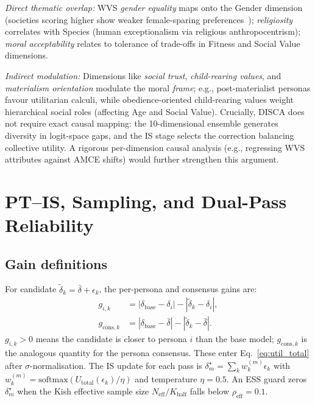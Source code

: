 \documentclass{article}
\begin{document}
\emph{Direct thematic overlap:} WVS \emph{gender equality} maps onto the
Gender dimension (societies scoring higher show weaker female-sparing
preferences~\citep{awad2018moral}); \emph{religiosity} correlates with
Species (human exceptionalism via religious anthropocentrism);
\emph{moral acceptability} relates to tolerance of trade-offs in Fitness and
Social Value dimensions.

\emph{Indirect modulation:} Dimensions like \emph{social trust},
\emph{child-rearing values}, and \emph{materialism orientation} modulate the
moral \emph{frame}; e.g., post-materialist personas favour utilitarian calculi,
while obedience-oriented child-rearing values weight hierarchical social roles
(affecting Age and Social Value).
Crucially, DISCA does not require exact causal mapping: the 10-dimensional
ensemble generates diversity in logit-space gaps, and the IS stage selects the
correction balancing collective utility. A rigorous per-dimension causal analysis
(e.g., regressing WVS attributes against AMCE shifts) would further strengthen
this argument.

\section{PT--IS, Sampling, and Dual-Pass Reliability}
\label{app:dpbr_theory}

\subsection{Gain definitions}

For candidate $\tilde{\delta}_k = \bar{\delta} + \epsilon_k$, the per-persona
and consensus gains are:
\begin{align}
  g_{i,k} &= |\delta_{\text{base}} - \delta_i| - |\tilde{\delta}_k - \delta_i|,
  \label{eq:g_per_agent} \\
  g_{\text{cons},k} &= |\delta_{\text{base}} - \bar{\delta}| - |\tilde{\delta}_k - \bar{\delta}|.
  \label{eq:g_cons}
\end{align}
$g_{i,k} > 0$ means the candidate is closer to persona $i$ than the base model;
$g_{\text{cons},k}$ is the analogous quantity for the persona consensus.
These enter Eq.~\ref{eq:util_total} after $\sigma$-normalisation.
The IS update for each pass is $\delta^{\star}_m = \sum_k w_k^{(m)} \epsilon_k$
with $w_k^{(m)} = \mathrm{softmax}(U_{\text{total}}(\epsilon_k)/\eta)$ and
temperature $\eta=0.5$.  An ESS guard zeros $\delta^{\star}_m$ when the
Kish effective sample size $N_{\mathrm{eff}}/K_{\text{half}}$ falls below
$\rho_{\mathrm{eff}}=0.1$.
\end{document}
